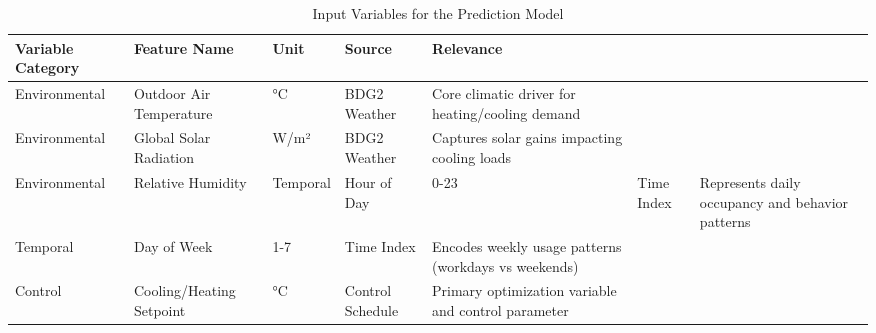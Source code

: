 \begin{table}[h]
\centering
\caption{Input Variables for the Prediction Model}
\label{tab:input_variables}
\begin{tabular}{lllll}
\hline
Variable Category & Feature Name & Unit & Source & Relevance \\
\hline
Environmental & Outdoor Air Temperature & °C & BDG2 Weather & Core climatic driver for heating/cooling demand \\
Environmental & Global Solar Radiation & W/m² & BDG2 Weather & Captures solar gains impacting cooling loads \\
Environmental & Relative Humidity & %
Temporal & Hour of Day & 0-23 & Time Index & Represents daily occupancy and behavior patterns \\
Temporal & Day of Week & 1-7 & Time Index & Encodes weekly usage patterns (workdays vs weekends) \\
Control & Cooling/Heating Setpoint & °C & Control Schedule & Primary optimization variable and control parameter \\
\hline
\end{tabular}
\end{table}
